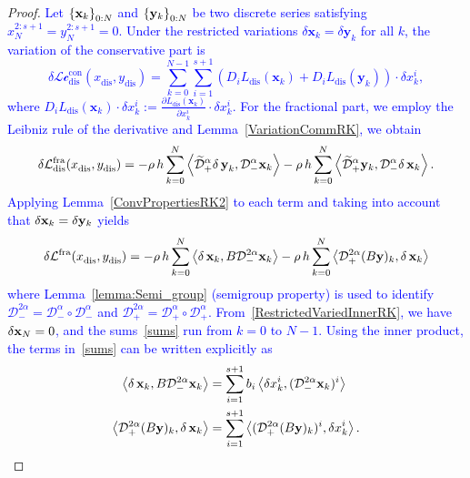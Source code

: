 \documentclass[a4paper,10pt,reqno]{amsart}
\theoremstyle{definition}
\newcommand{\lp}{\left(}
\newcommand{\rp}{\right)}
\newcommand{\Lc}{\mathcal{Lc}^{\text{con}}}
\newcommand{\Lf}{\mathcal{L}^{\text{fra}}}
\newcommand{\dis}{\text{dis}}
\begin{document}
\begin{proof}
\textcolor{blue}{Let $\left\{{\bf x}_k\right\}_{0:N}$ and $\left\{{\bf y}_k\right\}_{0:N}$ be  two discrete series satisfying $x_N^{2:s+1}=y_N^{2:s+1}=0$. Under the restricted variations $\delta \mathbf x_k=  \delta\mathbf  y_k$ for all $k$,  the 
variation of  the conservative part is
\begin{equation}\label{eq:variation_proof}
\delta\Lc_\dis(x_\dis^{},y_\dis^{})=\sum_{k=0}^{N-1}\sum_{i=1}^{s+1}\lp D_iL_\dis(\mathbf x_k)+D_iL_\dis(\mathbf y_k)\rp \cdot \delta x_k^{i},
\end{equation}
where $D_iL_\dis(\mathbf x_k)\cdot\delta x_k^{i}:=\frac{\partial L_\dis(\mathbf x_k)}{\partial x_k^{i}}\cdot\delta x_k^{i}$. For the fractional part, we employ the Leibniz rule of the derivative and Lemma~\ref{VariationCommRK}, we obtain
\[
\delta\Lf_\dis(x_\dis^{},y_\dis^{})=-\rho\,h\sum_{k=0}^{N}\left\langle\widetilde{\mathcal{D}}^{\alpha}_{+}{\bf \delta\, y}_k,\mathcal{D}^{\alpha}_{-}{\bf x}_k\right\rangle -\rho\,h\sum_{k=0}^{N}\left\langle\widetilde{\mathcal{D}}^{\alpha}_{+}{\bf y}_k,\mathcal{D}^{\alpha}_{-}{\bf \delta\, x}_k\right\rangle.
\]
Applying Lemma~\ref{ConvPropertiesRK2} to each term  and taking into account that $\delta {\bf x}_k = \delta {\bf y}_k$ yields
\begin{equation}\label{sums}
    \delta\Lf(x_\dis^{},y_\dis^{})=-\rho\,h\sum_{k=0}^{N}\left\langle{\bf \delta\, x}_k,B\mathcal{D}^{2\alpha}_{-}{\bf x}_k\right\rangle -\rho\,h\sum_{k=0}^{N}\left\langle\mathcal{D}^{2\alpha}_{+}(B{\bf  y})_k,{\bf \delta\, x}_k\right\rangle
\end{equation}
where Lemma~\ref{lemma:Semi_group} (semigroup property) is used to identify $\mathcal D_-^{2\alpha}=\mathcal D_-^\alpha\circ \mathcal D_-^\alpha$ and $\mathcal D_+^{2\alpha}=\mathcal D_+^\alpha\circ \mathcal D_+^\alpha$. From~\eqref{RestrictedVariedInnerRK}, we have $\delta {\bf x}_N=0$, and the sums~\eqref{sums} run from $k=0$ to $N-1$.
Using the inner product, the terms in~\eqref{sums} can be written explicitly as
\begin{align*}
    \left\langle{\bf \delta\, x}_k,B\mathcal{D}^{2\alpha}_{-}{\bf x}_k\right\rangle&=\sum_{i=1}^{s+1}b_i\left\langle{ \delta x}_k^i,(\mathcal{D}^{2\alpha}_{-}{\bf x}_k)^i\right\rangle\\\left\langle\mathcal{D}^{2\alpha}_{+}(B{\bf  y})_k,{\bf \delta\, x}_k\right\rangle&=\sum_{i=1}^{s+1}\left\langle(\mathcal{D}^{2\alpha}_{+}(B{\bf  y})_k)^i,{  \delta  x}_k^i\right\rangle.
\end{align*}
}
\end{proof}
\end{document}
